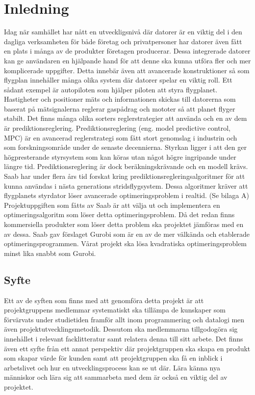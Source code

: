 \section{Inledning}
Idag när samhället har nått en utveckligsnivå där datorer är en viktig del i den dagliga verksamheten för både företag och privatpersoner har datorer även fått en plats i många av de produkter företagen producerar. Dessa integrerade datorer kan ge användaren en hjälpande hand för att denne ska kunna utföra fler och mer komplicerade uppgifter. Detta innebär även att avancerade konstruktioner så som flygplan innehåller många olika system där datorer spelar en viktig roll. Ett sådant exempel är autopiloten som hjälper piloten att styra flygplanet. Hastigheter och positioner mäts och informationen skickas till datorerna som baserat på mätsignalerna reglerar gaspådrag och mototer så att planet flyger stabilt. Det finns många olika sorters reglerstrategier att använda och en av dem är prediktionsreglering. 
\newline
\newline
Prediktionsreglering (eng. model predictive control, MPC) är en avancerad reglerstrategi som fått stort genomslag i industrin och som forskningsområde under de senaste decennierna. Styrkan ligger i att den ger högpresterande styrsystem som kan köras utan något högre ingripande under längre tid. Prediktionsreglering är dock beräkningskrävande och en modell krävs. \citep[2]{ir}
\newline
\newline
Saab har under flera års tid forskat kring prediktionsregleringsalgoritmer för att kunna användas i nästa generations stridsflygsystem. Dessa algoritmer kräver att flygplanets styrdator löser avancerade optimeringsproblem i realtid. (Se bilaga A)
\newline
\newline
Projektuppgiften som fåtts av Saab är att välja ut och implementera en optimeringsalgoritm som löser detta optimeringsproblem. Då det redan finns kommersiella produkter som löser detta problem ska projektet jämföras med en av dessa. Saab gav förslaget Gurobi som är en av de mer välkända och etablerade optimeringsprogrammen. Vårat projekt ska lösa kvadratiska optimeringsproblem minst lika snabbt som Gurobi.     

\subsection{Syfte}
Ett av de syften som finns med att genomföra detta projekt är att projektgruppens medlemmar systematiskt ska tillämpa de kunskaper som förvärvats under studietiden framför allt inom programmering och datalogi men även projektutvecklingsmetodik. Dessutom ska medlemmarna tillgodogöra sig innehållet i relevant facklitteratur samt relatera denna till sitt arbete. 
Det finns även ett syfte från ett annat perspektiv där projektgruppen ska skapa en produkt som skapar värde för kunden samt att projektgruppen ska få en inblick i arbetslivet och hur en utvecklingsprocess kan se ut där. Lära känna nya människor och lära sig att sammarbeta med dem är också en viktig del av projektet. 


